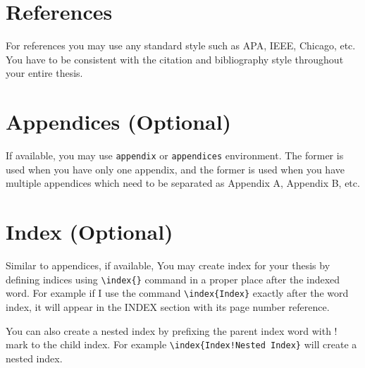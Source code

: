 



\section{References}\label{sec:references}
For references you may use any standard style such as APA, IEEE, Chicago, etc. You have to be consistent with the citation and bibliography style throughout your entire thesis.

\section{Appendices (Optional)}\label{sec:appendices}
If available, you may use \texttt{appendix} or \texttt{appendices} environment. The former is used when you have only one appendix, and the former is used when you have multiple appendices which need to be separated as Appendix A, Appendix B, etc.


\section{Index (Optional)}\label{sec:index}
Similar to appendices, if available, You may create index for your thesis by defining indices using \texttt{\textbackslash{index}\{\}} command in a proper place after the indexed word. For example if I use the command \texttt{\textbackslash{index}\{Index\}} exactly after the word index, it will appear in the INDEX section with its page number reference.

You can also create a nested index by prefixing the parent index word with ! mark to the child index. For example \texttt{\textbackslash{index}\{Index!Nested Index\}} will create a nested index.
